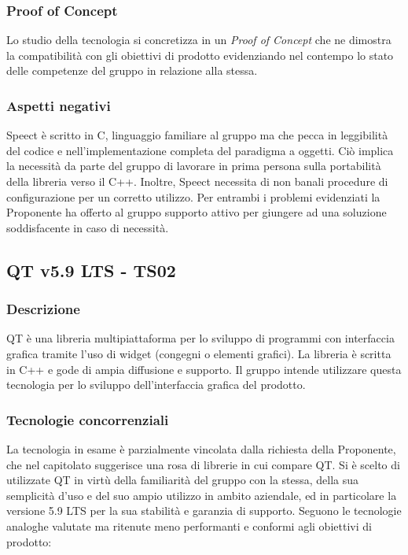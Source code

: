 \documentclass[./../Technology Baseline.tex]{subfiles}
\begin{document}
\subsubsection{Proof of Concept}
Lo studio della tecnologia si concretizza in un \textit{Proof of Concept} che ne dimostra la compatibilità con gli obiettivi di prodotto evidenziando nel contempo lo stato delle competenze del gruppo in relazione alla stessa.

\subsubsection{Aspetti negativi}
Speect è scritto in C, linguaggio familiare al gruppo ma che pecca in leggibilità del codice e nell'implementazione completa del paradigma a oggetti. Ciò implica la necessità da parte del gruppo di lavorare in prima persona sulla portabilità della libreria verso il C++. Inoltre, Speect necessita di non banali procedure di configurazione per un corretto utilizzo. Per entrambi i problemi evidenziati la Proponente ha offerto al gruppo supporto attivo per giungere ad una soluzione soddisfacente in caso di necessità. 

\subsection{QT v5.9 LTS - TS02}

\subsubsection{Descrizione}

QT è una libreria multipiattaforma per lo sviluppo di programmi con interfaccia grafica tramite l'uso di widget (congegni o elementi grafici). La libreria è scritta in C++ e gode di ampia diffusione e supporto. Il gruppo intende utilizzare questa tecnologia per lo sviluppo dell'interfaccia grafica del prodotto.  

\subsubsection{Tecnologie concorrenziali}
La tecnologia in esame è parzialmente vincolata dalla richiesta della Proponente, che nel capitolato suggerisce una rosa di librerie in cui compare QT. Si è scelto di utilizzate QT in virtù della familiarità del gruppo con la stessa, della sua semplicità d'uso e del suo ampio utilizzo in ambito aziendale, ed in particolare la versione 5.9 LTS per la sua stabilità e garanzia di supporto. Seguono le tecnologie analoghe valutate ma ritenute meno performanti e conformi agli obiettivi di prodotto:
\end{document}
